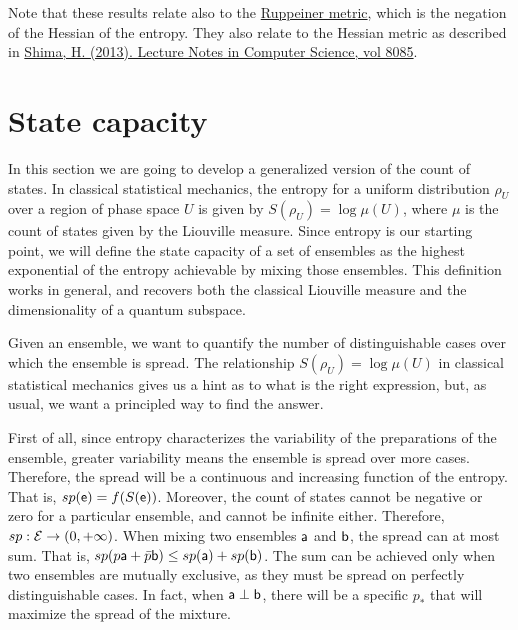 \begin{mathSection}
\begin{remark}
	Note that these results relate also to the \href{https://en.wikipedia.org/wiki/Ruppeiner_geometry}{Ruppeiner metric}, which is the negation of the Hessian of the entropy. They also relate to the Hessian metric as described in \href{https://link.springer.com/chapter/10.1007/978-3-642-40020-9_4}{Shima, H. (2013). Lecture Notes in Computer Science, vol 8085}.
\end{remark}
\end{mathSection}

\section{State capacity}

In this section we are going to develop a generalized version of the count of states. In classical statistical mechanics, the entropy for a uniform distribution $\rho_U$ over a region of phase space $U$ is given by $S(\rho_U) = \log \mu(U)$, where $\mu$ is the count of states given by the Liouville measure. Since entropy is our starting point, we will define the state capacity of a set of ensembles as the highest exponential of the entropy achievable by mixing those ensembles. This definition works in general, and recovers both the classical Liouville measure and the dimensionality of a quantum subspace.

Given an ensemble, we want to quantify the number of distinguishable cases over which the ensemble is spread. The relationship $S(\rho_U) = \log \mu(U)$ in classical statistical mechanics gives us a hint as to what is the right expression, but, as usual, we want a principled way to find the answer.

First of all, since entropy characterizes the variability of the preparations of the ensemble, greater variability means the ensemble is spread over more cases. Therefore, the spread will be a continuous and increasing function of the entropy. That is, $sp(\ens)=f(S(\ens))$. Moreover, the count of states cannot be negative or zero for a particular ensemble, and cannot be infinite either. Therefore, $sp : \Ens \to (0,+\infty)$. When mixing two ensembles $\ens[a]$ and $\ens[b]$, the spread can at most sum. That is, $sp(p\ens[a] + \bar{p} \ens[b]) \leq sp(\ens[a]) +sp(\ens[b])$. The sum can be achieved only when two ensembles are mutually exclusive, as they must be spread on perfectly distinguishable cases. In fact, when $\ens[a] \ortho \ens[b]$, there will be a specific $p_*$ that will maximize the spread of the mixture.


